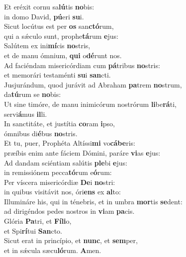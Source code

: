 \evenverse Et eréxit cornu sa\textbf{lú}tis \textbf{no}bis:~\*\\
\evenverse in domo David, \textbf{pú}eri \textbf{su}i.\\
\oddverse Sicut locútus est per \textbf{os} san\textbf{ctó}rum,~\*\\
\oddverse qui a sǽculo sunt, prophe\textbf{tá}rum \textbf{e}jus:\\
\evenverse Salútem ex ini\textbf{mí}cis \textbf{no}stris,~\*\\
\evenverse et de manu ómnium, \textbf{qui} o\textbf{dé}runt nos.\\
\oddverse Ad faciéndam misericórdiam cum \textbf{pá}tribus \textbf{no}stris:~\*\\
\oddverse et memorári testaménti \textbf{su}i \textbf{san}cti.\\
\evenverse Jusjurándum, quod jurávit ad Abraham \textbf{pa}trem \textbf{no}strum,~\*\\
\evenverse da\textbf{tú}rum se \textbf{no}bis:\\
\oddverse Ut sine timóre, de manu inimicórum nostrórum \textbf{li}be\textbf{rá}ti,~\*\\
\oddverse servi\textbf{á}mus \textbf{il}li.\\
\evenverse In sanctitáte, et justítia \textbf{co}ram \textbf{i}pso,~\*\\
\evenverse ómnibus di\textbf{é}bus \textbf{no}stris.\\
\oddverse Et tu, puer, Prophéta Altíssi\textbf{mi} vo\textbf{cá}\textbf{be}ris:~\*\\
\oddverse præíbis enim ante fáciem Dómini, paráre \textbf{vi}as \textbf{e}jus:\\
\evenverse Ad dandam sciéntiam salútis \textbf{ple}bi \textbf{e}jus:~\*\\
\evenverse in remissiónem pecca\textbf{tó}rum e\textbf{ó}rum:\\
\oddverse Per víscera misericórdiæ \textbf{De}i \textbf{no}stri:~\*\\
\oddverse in quibus visitávit nos, óri\textbf{ens} ex \textbf{al}to:\\
\evenverse Illumináre his, qui in ténebris, et in umbra \textbf{mor}tis \textbf{se}dent:~\*\\
\evenverse ad dirigéndos pedes nostros in \textbf{vi}am \textbf{pa}cis.\\
\oddverse Glória \textbf{Pa}tri, et \textbf{Fí}\textbf{li}o,~\*\\
\oddverse et Spi\textbf{rí}tui \textbf{San}cto.\\
\evenverse Sicut erat in princípio, et \textbf{nunc}, et \textbf{sem}per,~\*\\
\evenverse et in sǽcula sæcu\textbf{ló}rum. \textbf{A}men.\\

